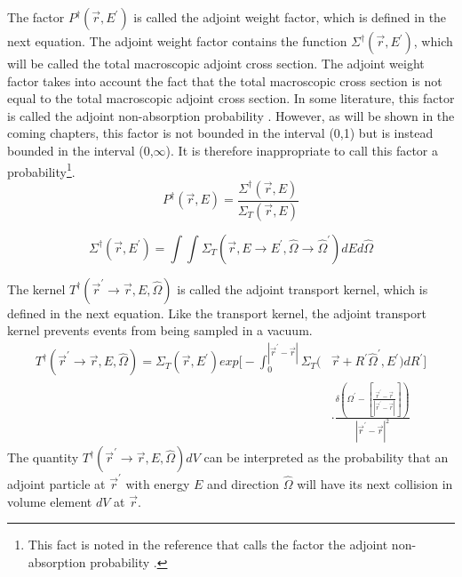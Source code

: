 The factor $P^{\dagger}(\vec{r},E^{'})$ is called the adjoint weight factor, which
is defined in the next equation. The adjoint weight factor contains the 
function $\Sigma^{\dagger}(\vec{r},E^{'})$, which will be called the total
macroscopic adjoint cross section. The adjoint weight factor takes into account 
the fact that the total macroscopic cross section is not equal to the total 
macroscopic adjoint cross section. In some literature, this factor is called 
the adjoint non-absorption probability \citep{gabler_amos_2006}. However, as 
will be shown in the coming chapters, this factor is not bounded in the 
interval (0,1) but is instead bounded in the interval (0,$\infty$). It is 
therefore inappropriate to call this factor a probability\footnote{This fact is
noted in the reference that calls the factor the adjoint non-absorption 
probability \citep{gabler_amos_2006}.}.
\begin{equation}
  P^{\dagger}(\vec{r},E) = \frac{\Sigma^{\dagger}(\vec{r},E)}
  {\Sigma_T(\vec{r},E)}
\end{equation}

\begin{equation}
  \Sigma^{\dagger}(\vec{r},E^{'}) = \int\int 
  \Sigma_T(\vec{r},E \to E^{'},\hat{\Omega} \to \hat{\Omega}^{'}) dEd\hat{\Omega}
  \label{eq:total_adjoint_cross_section}
\end{equation}

The kernel $T^{\dagger}(\vec{r}^{'} \to \vec{r},E,\hat{\Omega})$ is called
the adjoint transport kernel, which is defined in the next equation. Like the
transport kernel, the adjoint transport kernel prevents events from being
sampled in a vacuum.
\begin{equation}
  \begin{split}
  T^{\dagger}(\vec{r}^{'} \to \vec{r},E,\hat{\Omega}) = 
  \Sigma_T(\vec{r},E^{'}) exp\Big[-\int_0^{|\vec{r}^{'} - \vec{r}|} 
      \Sigma_T(&\vec{r}+R^{'}\hat{\Omega}^{'},E^{'})dR^{'} \Big] \\
    & \cdot \frac{\delta \left(\Omega^{'} - \left[\frac{\vec{r}^{'} - \vec{r}}
        {|\vec{r}^{'} - \vec{r}|}\right]\right)}
    {|\vec{r}^{'} - \vec{r}|^2}
  \end{split}
\end{equation}
The quantity $T^{\dagger}(\vec{r}^{'} \to \vec{r},E,\hat{\Omega})dV$ can be
interpreted as the probability that an adjoint particle at $\vec{r}^{'}$ with
energy $E$ and direction $\hat{\Omega}$ will have its next collision in volume
element $dV$ at $\vec{r}$.

